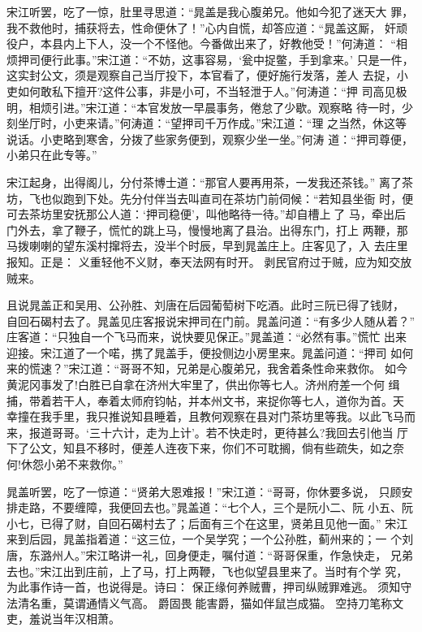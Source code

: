 宋江听罢，吃了一惊，肚里寻思道：“晁盖是我心腹弟兄。他如今犯了迷天大
罪，我不救他时，捕获将去，性命便休了！”心内自慌，却答应道：“晁盖这厮，
奸顽役户，本县内上下人，没一个不怪他。今番做出来了，好教他受！”何涛道：
“相烦押司便行此事。”宋江道：“不妨，这事容易，‘瓮中捉鳖，手到拿来。’
只是一件，这实封公文，须是观察自己当厅投下，本官看了，便好施行发落，差人
去捉，小吏如何敢私下擅开?这件公事，非是小可，不当轻泄于人。”何涛道：“押
司高见极明，相烦引进。”宋江道：“本官发放一早晨事务，倦怠了少歇。观察略
待一时，少刻坐厅时，小吏来请。”何涛道：“望押司千万作成。”宋江道：“理
之当然，休这等说话。小吏略到寒舍，分拨了些家务便到，观察少坐一坐。”何涛
道：“押司尊便，小弟只在此专等。”

宋江起身，出得阁儿，分付茶博士道：“那官人要再用茶，一发我还茶钱。”
离了茶坊，飞也似跑到下处。先分付伴当去叫直司在茶坊门前伺候：“若知县坐衙
时，便可去茶坊里安抚那公人道：‘押司稳便’，叫他略待一待。”却自槽上了
马，牵出后门外去，拿了鞭子，慌忙的跳上马，慢慢地离了县治。出得东门，打上
两鞭，那马拨喇喇的望东溪村撺将去，没半个时辰，早到晁盖庄上。庄客见了，入
去庄里报知。正是：
义重轻他不义财，奉天法网有时开。
剥民官府过于贼，应为知交放贼来。

且说晁盖正和吴用、公孙胜、刘唐在后园葡萄树下吃酒。此时三阮已得了钱财，
自回石碣村去了。晁盖见庄客报说宋押司在门前。晁盖问道：“有多少人随从着？”
庄客道：“只独自一个飞马而来，说快要见保正。”晁盖道：“必然有事。”慌忙
出来迎接。宋江道了一个喏，携了晁盖手，便投侧边小房里来。晁盖问道：“押司
如何来的慌速？”宋江道：“哥哥不知，兄弟是心腹弟兄，我舍着条性命来救你。
如今黄泥冈事发了!白胜已自拿在济州大牢里了，供出你等七人。济州府差一个何
缉捕，带着若干人，奉着太师府钧帖，并本州文书，来捉你等七人，道你为首。天
幸撞在我手里，我只推说知县睡着，且教何观察在县对门茶坊里等我。以此飞马而
来，报道哥哥。‘三十六计，走为上计’。若不快走时，更待甚么?我回去引他当
厅下了公文，知县不移时，便差人连夜下来，你们不可耽搁，倘有些疏失，如之奈
何!休怨小弟不来救你。”

晁盖听罢，吃了一惊道：“贤弟大恩难报！”宋江道：“哥哥，你休要多说，
只顾安排走路，不要缠障，我便回去也。”晁盖道：“七个人，三个是阮小二、阮
小五、阮小七，已得了财，自回石碣村去了；后面有三个在这里，贤弟且见他一面。”
宋江来到后园，晁盖指着道：“这三位，一个吴学究；一个公孙胜，蓟州来的；一
个刘唐，东潞州人。”宋江略讲一礼，回身便走，嘱付道：“哥哥保重，作急快走，
兄弟去也。”宋江出到庄前，上了马，打上两鞭，飞也似望县里来了。当时有个学
究，为此事作诗一首，也说得是。诗曰：
保正缘何养贼曹，押司纵贼罪难逃。
须知守法清名重，莫谓通情义气高。
爵固畏能害爵，猫如伴鼠岂成猫。
空持刀笔称文吏，羞说当年汉相萧。

